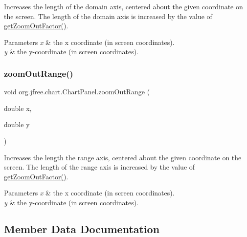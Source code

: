 Increases the length of the domain axis, centered about the given coordinate on the screen. The length of the domain axis is increased by the value of \mbox{\hyperlink{classorg_1_1jfree_1_1chart_1_1_chart_panel_a5cd5ea564c46614edff846c7c0afbb9d}{get\+Zoom\+Out\+Factor()}}.


\begin{DoxyParams}{Parameters}
{\em x} & the x coordinate (in screen coordinates). \\
\hline
{\em y} & the y-\/coordinate (in screen coordinates). \\
\hline
\end{DoxyParams}
\mbox{\label{classorg_1_1jfree_1_1chart_1_1_chart_panel_a2242d982464a13cd3c37d8b9a85ddf74}} 
\subsubsection{\texorpdfstring{zoom\+Out\+Range()}{zoomOutRange()}}
{\footnotesize\ttfamily void org.\+jfree.\+chart.\+Chart\+Panel.\+zoom\+Out\+Range (\begin{DoxyParamCaption}\item[{double}]{x,  }\item[{double}]{y }\end{DoxyParamCaption})}

Increases the length the range axis, centered about the given coordinate on the screen. The length of the range axis is increased by the value of \mbox{\hyperlink{classorg_1_1jfree_1_1chart_1_1_chart_panel_a5cd5ea564c46614edff846c7c0afbb9d}{get\+Zoom\+Out\+Factor()}}.


\begin{DoxyParams}{Parameters}
{\em x} & the x coordinate (in screen coordinates). \\
\hline
{\em y} & the y-\/coordinate (in screen coordinates). \\
\hline
\end{DoxyParams}


\subsection{Member Data Documentation}
\mbox{\label{classorg_1_1jfree_1_1chart_1_1_chart_panel_aadc71bcb5f92b57b0a701f0c2941ee94}} 
